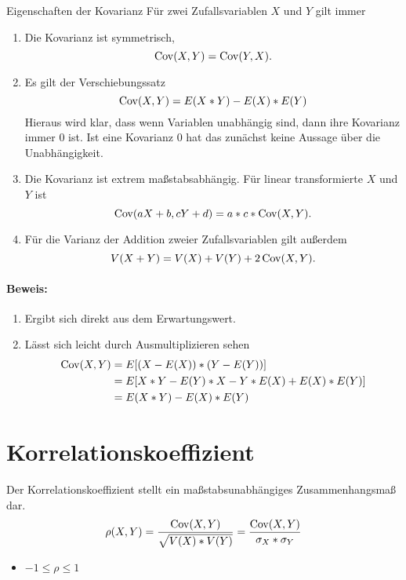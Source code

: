 \begin{satz}{Eigenschaften der Kovarianz}%
	Für zwei Zufallsvariablen $X$ und $Y$ gilt immer
	\begin{enumerate}%
		\item Die Kovarianz ist symmetrisch, 
		\begin{equation*}
			\operatorname{Cov}(X,Y)=\operatorname{Cov}(Y,X).
		\end{equation*}
		\item Es gilt der Verschiebungssatz
		\begin{equation*}
			\operatorname{Cov}(X,Y)=E(X*Y)-E(X)*E(Y)
		\end{equation*}
		Hieraus wird klar, dass wenn Variablen unabhängig sind, dann ihre Kovarianz immer $0$ ist. Ist eine Kovarianz $0$ hat das zunächst keine Aussage über die Unabhängigkeit.
		\item Die Kovarianz ist extrem maßstabsabhängig. Für linear transformierte $X$ und $Y$ ist
		\begin{equation*}
			\operatorname{Cov}(aX+b,cY+d)=a*c*\operatorname{Cov}(X,Y).
		\end{equation*}
		\item Für die Varianz der Addition zweier Zufallsvariablen gilt außerdem
		\begin{equation*}
			V(X+Y)=V(X)+V(Y)+2\operatorname{Cov}(X,Y).
		\end{equation*}
	\end{enumerate}
\end{satz}
\paragraph{Beweis:}
\begin{enumerate}
	\item Ergibt sich direkt aus dem Erwartungswert.
	\item Lässt sich leicht durch Ausmultiplizieren sehen
	\begin{align*}%
		\cov(X,Y)&=E[(X-E(X))*(Y-E(Y))]\\
		&=E[X*Y-E(Y)*X-Y*E(X)+E(X)*E(Y)]\\
		&=E(X*Y)-E(X)*E(Y)
	\end{align*}
\end{enumerate}

\section{Korrelationskoeffizient}
Der Korrelationskoeffizient stellt ein maßstabsunabhängiges Zusammenhangsmaß dar.
\begin{equation*}
	\rho(X,Y)=\frac{\operatorname{Cov}(X,Y)}{\sqrt{V(X)*V(Y)}}=\frac{\operatorname{Cov}(X,Y)}{\sigma_X*\sigma_Y}
\end{equation*}
\begin{itemize}
	\item $-1\leq\rho\leq1$
\end{itemize}